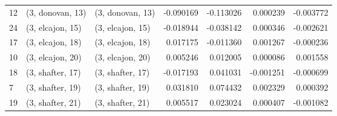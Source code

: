 \begin{tabular}{lllrrrr}
12 &  (3, donovan, 13) &  (3, donovan, 13) & -0.090169 & -0.113026 &   0.000239 & -0.003772 \\
24 &  (3, elcajon, 15) &  (3, elcajon, 15) & -0.018944 & -0.038142 &   0.000346 & -0.002621 \\
17 &  (3, elcajon, 18) &  (3, elcajon, 18) &  0.017175 & -0.011360 &   0.001267 & -0.000236 \\
10 &  (3, elcajon, 20) &  (3, elcajon, 20) &  0.005246 &  0.012005 &   0.000086 &  0.001558 \\
18 &  (3, shafter, 17) &  (3, shafter, 17) & -0.017193 &  0.041031 &  -0.001251 & -0.000699 \\
7  &  (3, shafter, 19) &  (3, shafter, 19) &  0.031810 &  0.074432 &   0.002329 &  0.000392 \\
19 &  (3, shafter, 21) &  (3, shafter, 21) &  0.005517 &  0.023024 &   0.000407 & -0.001082 \\
\bottomrule
\end{tabular}
